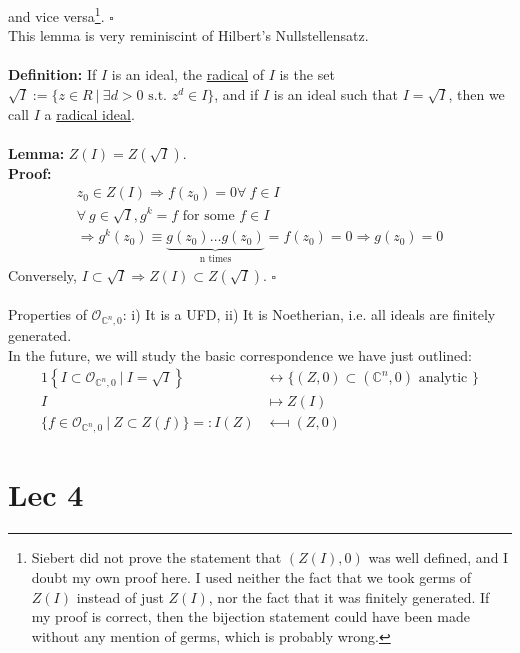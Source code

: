 \documentclass[12pt]{report}
\theoremstyle{definition}
\theoremstyle{remark}
\numberwithin{equation}{section}
\theoremstyle{definition}
\newcommand{\bb}[1]{\mathbb{#1}}
\newcommand{\mqed}{\hfill\newline\null \hfill$\square$\\ }
\begin{document}
and vice versa\footnote{Siebert did not prove the statement that $(Z(I),0)$ was well defined, and I doubt my own proof here. I used neither the fact that we took germs of $Z(I)$ instead of just $Z(I)$, nor the fact that it was finitely generated. If my proof is correct, then the bijection statement could have been made without any mention of germs, which is probably wrong. }. \mqed
This lemma is very reminiscint of Hilbert's Nullstellensatz. \\\\
\textbf{Definition: }If $I$ is an ideal, the \underline{radical} of $I$ is the set $\sqrt I := \{z \in R\ |\ \exists d > 0 \text{ s.t. } z^d \in I\}$, and if $I$ is an ideal such that $I = \sqrt I$, then we call $I$ a \underline{radical ideal}. \\\\
\textbf{Lemma: }$Z(I) = Z(\sqrt I)$.  \\
\textbf{Proof: }
\begin{gather*}
	z_0 \in Z(I) \Rightarrow f(z_0) = 0 \forall\ f \in I\\
	\forall\ g \in \sqrt I, g^k = f \text{ for some } f \in I\\
	\Rightarrow g^k(z_0) \equiv \underbrace{g(z_0) \dots g(z_0)}_{\text{n times}} = f(z_0) = 0 \Rightarrow g(z_0) = 0
\end{gather*}
Conversely, $I \subset \sqrt I \Rightarrow 
Z(I) \subset Z(\sqrt I)$. \mqed \\
Properties of $\mathcal{O}_{\bb C^n,0}$: i) It is a UFD, ii) It is Noetherian, i.e. all ideals are finitely generated. \\
In the future, we will study the basic correspondence we have just outlined:\\
\begin{alignat*}{1}
	\left\{I \subset \mathcal{O}_{\bb C^n,0}\ |\ I = \sqrt I\right\} &\longleftrightarrow
\{(Z,0)\subset (\bb C^n,0) \text{ analytic }\}\\
	I &\longmapsto Z(I)\\
	\{f \in \mathcal{O}_{\bb C^n,0}\ |\ Z \subset Z(f)\} =:I(Z) &\longmapsfrom (Z,0)
\end{alignat*}

\chapter{Lec 4}
\end{document}
